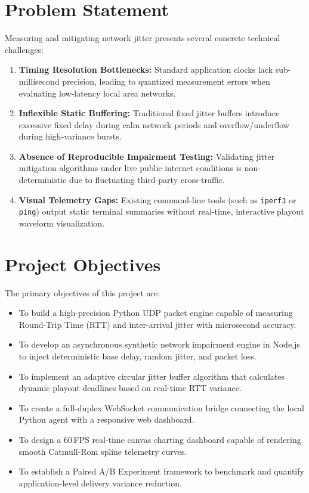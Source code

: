 \documentclass[12pt, a4paper]{report}
\begin{document}
\section{Problem Statement}
Measuring and mitigating network jitter presents several concrete technical challenges:
\begin{enumerate}
    \item \textbf{Timing Resolution Bottlenecks:} Standard application clocks lack sub-millisecond precision, leading to quantized measurement errors when evaluating low-latency local area networks.
    \item \textbf{Inflexible Static Buffering:} Traditional fixed jitter buffers introduce excessive fixed delay during calm network periods and overflow/underflow during high-variance bursts.
    \item \textbf{Absence of Reproducible Impairment Testing:} Validating jitter mitigation algorithms under live public internet conditions is non-deterministic due to fluctuating third-party cross-traffic.
    \item \textbf{Visual Telemetry Gaps:} Existing command-line tools (such as \texttt{iperf3} or \texttt{ping}) output static terminal summaries without real-time, interactive playout waveform visualization.
\end{enumerate}

\section{Project Objectives}
The primary objectives of this project are:
\begin{itemize}
    \item To build a high-precision Python UDP packet engine capable of measuring Round-Trip Time (RTT) and inter-arrival jitter with microsecond accuracy.
    \item To develop an asynchronous synthetic network impairment engine in Node.js to inject deterministic base delay, random jitter, and packet loss.
    \item To implement an adaptive circular jitter buffer algorithm that calculates dynamic playout deadlines based on real-time RTT variance.
    \item To create a full-duplex WebSocket communication bridge connecting the local Python agent with a responsive web dashboard.
    \item To design a 60\,FPS real-time canvas charting dashboard capable of rendering smooth Catmull-Rom spline telemetry curves.
    \item To establish a Paired A/B Experiment framework to benchmark and quantify application-level delivery variance reduction.
\end{itemize}
\end{document}
